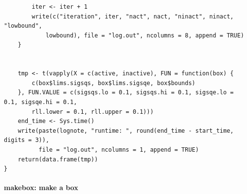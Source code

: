 \documentclass[ejs]{imsart}
\newcommand{\textcompute}{\textsf}
\begin{document}
\begin{verbatim}
        iter <- iter + 1
        write(c("iteration", iter, "nact", nact, "ninact", ninact, "lowbound",
            lowbound), file = "log.out", ncolumns = 8, append = TRUE)
    }


    tmp <- t(vapply(X = c(active, inactive), FUN = function(box) {
        c(box$lims.sigsqs, box$lims.sigsqe, box$bounds)
    }, FUN.VALUE = c(sigsqs.lo = 0.1, sigsqs.hi = 0.1, sigsqe.lo = 0.1, sigsqe.hi = 0.1,
        rll.lower = 0.1, rll.upper = 0.1)))
    end_time <- Sys.time()
    write(paste(lognote, "runtime: ", round(end_time - start_time, digits = 3)),
          file = "log.out", ncolumns = 1, append = TRUE)
    return(data.frame(tmp))
}
\end{verbatim}


\paragraph{\textcompute{makebox}: make a box}
\end{document}
